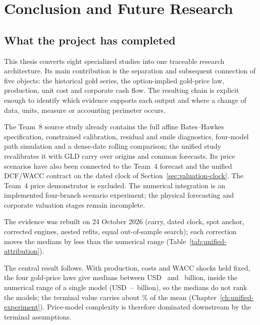 \chapter*{Conclusion and Future Research}

\section*{What the project has completed}

This thesis converts eight specialized studies into one traceable research
architecture. Its main contribution is the separation and subsequent
connection of five objects: the historical gold series, the option-implied
gold-price law, production, unit cost and corporate cash flow. The resulting
chain is explicit enough to identify which evidence supports each output and
where a change of data, units, measure or accounting perimeter occurs.

The Team~8 source study already contains the full affine Bates--Hawkes
specification, constrained calibration, residual and smile diagnostics,
four-model path simulation and a dense-date rolling comparison; the unified
study recalibrates it with GLD carry over \OosDates{} origins and
\OosObservations{} common forecasts. Its price scenarios have also been
connected to the Team~4 forecast and the unified DCF/WACC contract on the
dated clock of Section~\ref{sec:valuation-clock}.
The Team~4 price demonstrator is excluded. The numerical integration is an
implemented four-branch scenario experiment; the physical forecasting and
corporate valuation stages remain incomplete.

The evidence was rebuilt on 24 October 2026 (carry, dated clock, spot anchor,
corrected engines, nested refits, equal out-of-sample search); each correction
moves the medians by less than the numerical range
(Table~\ref{tab:unified-attribution}).

The central result follows. With production, costs and WACC shocks held
fixed, the four gold-price laws give medians between USD~\ValMedianLow{} and
\ValMedianHigh~billion, inside the numerical range of a single model
(USD~\NumericalMedianLow--\NumericalMedianHigh~billion), so the medians do not
rank the models; the terminal value carries about \TerminalShare\% of the mean
(Chapter~\ref{ch:unified-experiment}). Price-model complexity is therefore
dominated downstream by the terminal assumptions.

